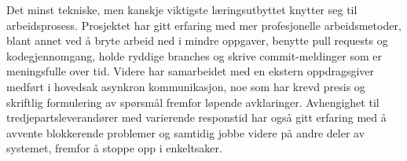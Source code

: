 
Det minst tekniske, men kanskje viktigste læringsutbyttet knytter seg til arbeidsprosess. Prosjektet har gitt erfaring med mer profesjonelle arbeidsmetoder, blant annet ved å bryte arbeid ned i mindre oppgaver, benytte pull requests og kodegjennomgang, holde ryddige branches og skrive commit-meldinger som er meningsfulle over tid. Videre har samarbeidet med en ekstern oppdragsgiver medført i hovedsak asynkron kommunikasjon, noe som har krevd presis og skriftlig formulering av spørsmål fremfor løpende avklaringer. Avhengighet til tredjepartsleverandører med varierende responstid har også gitt erfaring med å avvente blokkerende problemer og samtidig jobbe videre på andre deler av systemet, fremfor å stoppe opp i enkeltsaker.
